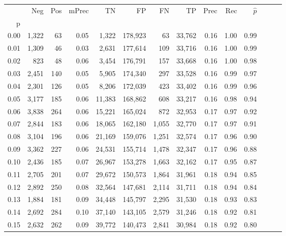 \begin{tabular}{rrrrrrrrrrrrrr}
\toprule
{} &    Neg &  Pos & mPrec &       TN &       FP &      FN &      TP &  Prec &   Rec & $\hat{p}$ \\
p    &        &      &       &          &          &         &         &       &       &           \\
\midrule
0.00 &  1,322 &   63 &  0.05 &    1,322 &  178,923 &      63 &  33,762 &  0.16 &  1.00 &      0.99 \\
0.01 &  1,309 &   46 &  0.03 &    2,631 &  177,614 &     109 &  33,716 &  0.16 &  1.00 &      0.99 \\
0.02 &    823 &   48 &  0.06 &    3,454 &  176,791 &     157 &  33,668 &  0.16 &  1.00 &      0.98 \\
0.03 &  2,451 &  140 &  0.05 &    5,905 &  174,340 &     297 &  33,528 &  0.16 &  0.99 &      0.97 \\
0.04 &  2,301 &  126 &  0.05 &    8,206 &  172,039 &     423 &  33,402 &  0.16 &  0.99 &      0.96 \\
0.05 &  3,177 &  185 &  0.06 &   11,383 &  168,862 &     608 &  33,217 &  0.16 &  0.98 &      0.94 \\
0.06 &  3,838 &  264 &  0.06 &   15,221 &  165,024 &     872 &  32,953 &  0.17 &  0.97 &      0.92 \\
0.07 &  2,844 &  183 &  0.06 &   18,065 &  162,180 &   1,055 &  32,770 &  0.17 &  0.97 &      0.91 \\
0.08 &  3,104 &  196 &  0.06 &   21,169 &  159,076 &   1,251 &  32,574 &  0.17 &  0.96 &      0.90 \\
0.09 &  3,362 &  227 &  0.06 &   24,531 &  155,714 &   1,478 &  32,347 &  0.17 &  0.96 &      0.88 \\
0.10 &  2,436 &  185 &  0.07 &   26,967 &  153,278 &   1,663 &  32,162 &  0.17 &  0.95 &      0.87 \\
0.11 &  2,705 &  201 &  0.07 &   29,672 &  150,573 &   1,864 &  31,961 &  0.18 &  0.94 &      0.85 \\
0.12 &  2,892 &  250 &  0.08 &   32,564 &  147,681 &   2,114 &  31,711 &  0.18 &  0.94 &      0.84 \\
0.13 &  1,884 &  181 &  0.09 &   34,448 &  145,797 &   2,295 &  31,530 &  0.18 &  0.93 &      0.83 \\
0.14 &  2,692 &  284 &  0.10 &   37,140 &  143,105 &   2,579 &  31,246 &  0.18 &  0.92 &      0.81 \\
0.15 &  2,632 &  262 &  0.09 &   39,772 &  140,473 &   2,841 &  30,984 &  0.18 &  0.92 &      0.80 \\

\end{tabular}
